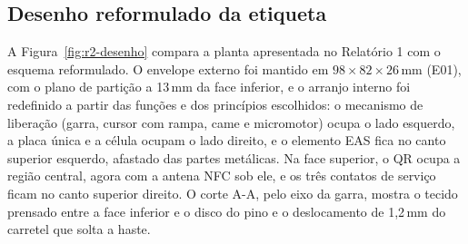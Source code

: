 \begin{landscape}
\begin{figure}[htbp]
{%
    }
\end{figure}
\end{landscape}

\subsection{Desenho reformulado da etiqueta}

A Figura~\ref{fig:r2-desenho} compara a planta apresentada no Relatório 1 com o esquema reformulado. O envelope externo foi mantido em $98 \times 82 \times 26$\,mm (E01), com o plano de partição a 13\,mm da face inferior, e o arranjo interno foi redefinido a partir das funções e dos princípios escolhidos: o mecanismo de liberação (garra, cursor com rampa, came e micromotor) ocupa o lado esquerdo, a placa única e a célula ocupam o lado direito, e o elemento EAS fica no canto superior esquerdo, afastado das partes metálicas. Na face superior, o QR ocupa a região central, agora com a antena NFC sob ele, e os três contatos de serviço ficam no canto superior direito. O corte A-A, pelo eixo da garra, mostra o tecido prensado entre a face inferior e o disco do pino e o deslocamento de 1,2\,mm do carretel que solta a haste.

